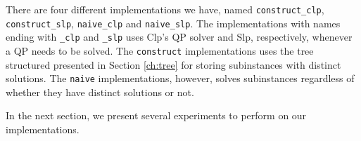 There are four different implementations we have, named
\texttt{construct\_clp}, \texttt{construct\_slp}, \texttt{naive\_clp} and
\texttt{naive\_slp}. The implementations with names ending with
\texttt{\_clp} and \texttt{\_slp} uses Clp's QP solver and Slp, respectively,
whenever a QP needs to be solved.
The \texttt{construct} implementations uses the tree structured presented
in Section \ref{ch:tree} for storing subinstances with distinct solutions.
The \texttt{naive} implementations, however, solves subinstances regardless of
whether they have distinct solutions or not.

In the next section, we present several experiments to perform on our
implementations.
